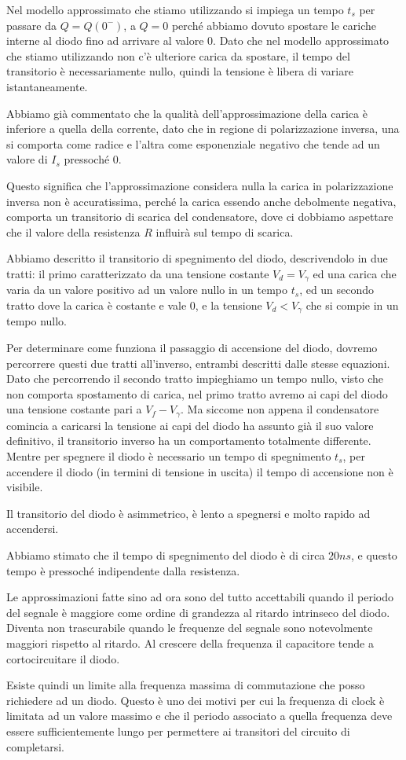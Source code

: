 \documentclass[../elettronica]{subfiles}
\begin{document}
Nel modello approssimato che stiamo utilizzando si impiega un tempo $t_s$ per passare da $Q = Q(0^-)$, a $Q = 0$
perché abbiamo dovuto spostare le cariche interne al diodo fino ad arrivare al valore 0.
Dato che nel modello approssimato che stiamo utilizzando non c'è ulteriore carica da spostare,
il tempo del transitorio è necessariamente nullo, quindi la tensione è libera di variare istantaneamente.

Abbiamo già commentato che la qualità dell'approssimazione della carica è inferiore a quella della corrente, dato
che in regione di polarizzazione inversa, una si comporta come radice e l'altra come esponenziale negativo che tende ad un
valore di $I_s$ pressoché 0.

Questo significa che l'approssimazione considera nulla la carica in polarizzazione inversa non è accuratissima, perché la
carica essendo anche debolmente negativa, comporta un transitorio di scarica del condensatore, dove ci dobbiamo aspettare che
il valore della resistenza $R$ influirà sul tempo di scarica.

Abbiamo descritto il transitorio di spegnimento del diodo, descrivendolo in due tratti:
il primo caratterizzato da una tensione costante $V_d = V_\gamma$ ed una carica che varia da un valore positivo
ad un valore nullo in un tempo $t_s$, ed un secondo tratto dove la carica è costante e vale 0,
e la tensione $V_d < V_\gamma$ che si compie in un tempo nullo.

Per determinare come funziona il passaggio di accensione del diodo, dovremo percorrere questi due tratti
all'inverso, entrambi descritti dalle stesse equazioni.
Dato che percorrendo il secondo tratto impieghiamo un tempo nullo, visto che non comporta spostamento di carica,
nel primo tratto avremo ai capi del diodo una tensione costante pari a $V_f - V_\gamma$.
Ma siccome non appena il condensatore comincia a caricarsi la tensione ai capi del diodo ha assunto già il suo
valore definitivo, il transitorio inverso ha un comportamento totalmente differente.
Mentre per spegnere il diodo è necessario un tempo di spegnimento $t_s$, per accendere il diodo (in termini di
tensione in uscita) il tempo di accensione non è visibile.

Il transitorio del diodo è asimmetrico, è lento a spegnersi e molto rapido ad accendersi.

Abbiamo stimato che il tempo di spegnimento del diodo è di circa $20ns$, e questo tempo è pressoché indipendente
dalla resistenza.

Le approssimazioni fatte sino ad ora sono del tutto accettabili quando il periodo del segnale è maggiore come
ordine di grandezza al ritardo intrinseco del diodo. Diventa non trascurabile quando le frequenze del segnale
sono notevolmente maggiori rispetto al ritardo. Al crescere della frequenza il capacitore tende a cortocircuitare
il diodo.

Esiste quindi un limite alla frequenza massima di commutazione che posso richiedere ad un diodo.
Questo è uno dei motivi per cui la frequenza di clock è limitata ad un valore massimo e che il periodo associato a
quella frequenza deve essere sufficientemente lungo per permettere ai transitori del
circuito di completarsi.
\end{document}
